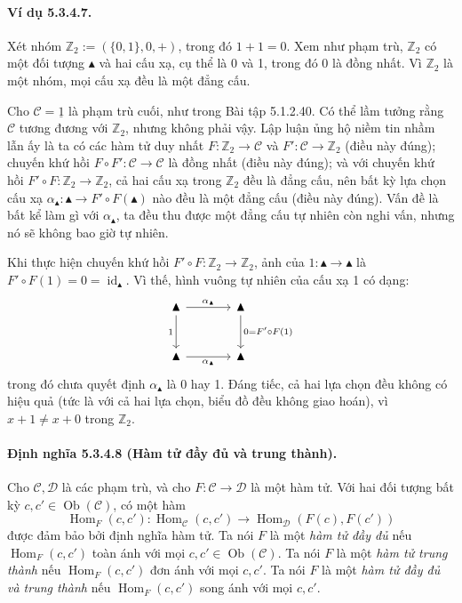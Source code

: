 \paragraph{Ví dụ 5.3.4.7.} Xét nhóm $\mathbb Z_2:=(\{0,1\},0,+)$, trong đó $1+1=0$. Xem như phạm trù, $\mathbb Z_2$ có một đối tượng $\blacktriangle$ và hai cấu xạ, cụ thể là 0 và 1, trong đó 0 là đồng nhất. Vì $\mathbb Z_2$ là một nhóm, mọi cấu xạ đều là một đẳng cấu.

Cho $\mathcal C=\underline{1}$ là phạm trù cuối, như trong Bài tập 5.1.2.40. Có thể lầm tưởng rằng $\mathcal C$ tương đương với $\mathbb Z_2$, nhưng không phải vậy. Lập luận ủng hộ niềm tin nhầm lẫn ấy là ta có các hàm tử duy nhất $F:\mathbb Z_2\to\mathcal C$ và $F':\mathcal C\to\mathbb Z_2$ (điều này đúng); chuyến khứ hồi $F\circ F':\mathcal C\to\mathcal C$ là đồng nhất (điều này đúng); và với chuyến khứ hồi $F'\circ F:\mathbb Z_2\to\mathbb Z_2$, cả hai cấu xạ trong $\mathbb Z_2$ đều là đẳng cấu, nên bất kỳ lựa chọn cấu xạ $\alpha_{\blacktriangle}:\blacktriangle\to F'\circ F(\blacktriangle)$ nào đều là một đẳng cấu (điều này đúng). Vấn đề là bất kể làm gì với $\alpha_{\blacktriangle}$, ta đều thu được một đẳng cấu tự nhiên còn nghi vấn, nhưng nó sẽ không bao giờ tự nhiên.

Khi thực hiện chuyến khứ hồi $F'\circ F:\mathbb Z_2\to\mathbb Z_2$, ảnh của $1:\blacktriangle\to\blacktriangle$ là $F'\circ F(1)=0=\operatorname{id}_{\blacktriangle}$. Vì thế, hình vuông tự nhiên của cấu xạ 1 có dạng:
\[\begin{tikzcd}[column sep=large,row sep=large]\blacktriangle\arrow[r,"\alpha_{\blacktriangle}"]\arrow[d,"1"']&\blacktriangle\arrow[d,"0=F'\circ F(1)"]\\\blacktriangle\arrow[r,"\alpha_{\blacktriangle}"']&\blacktriangle\end{tikzcd}\]
trong đó chưa quyết định $\alpha_{\blacktriangle}$ là 0 hay 1. Đáng tiếc, cả hai lựa chọn đều không có hiệu quả (tức là với cả hai lựa chọn, biểu đồ đều không giao hoán), vì $x+1\ne x+0$ trong $\mathbb Z_2$.
\paragraph{Định nghĩa 5.3.4.8 (Hàm tử đầy đủ và trung thành).} Cho $\mathcal C,\mathcal D$ là các phạm trù, và cho $F:\mathcal C\to\mathcal D$ là một hàm tử. Với hai đối tượng bất kỳ $c,c'\in\operatorname{Ob}(\mathcal C)$, có một hàm
\[\operatorname{Hom}_F(c,c'):\operatorname{Hom}_{\mathcal C}(c,c')\longrightarrow\operatorname{Hom}_{\mathcal D}(F(c),F(c'))\]
được đảm bảo bởi định nghĩa hàm tử. Ta nói $F$ là một \emph{hàm tử đầy đủ} nếu $\operatorname{Hom}_F(c,c')$ toàn ánh với mọi $c,c'\in\operatorname{Ob}(\mathcal C)$. Ta nói $F$ là một \emph{hàm tử trung thành} nếu $\operatorname{Hom}_F(c,c')$ đơn ánh với mọi $c,c'$. Ta nói $F$ là một \emph{hàm tử đầy đủ và trung thành} nếu $\operatorname{Hom}_F(c,c')$ song ánh với mọi $c,c'$.
